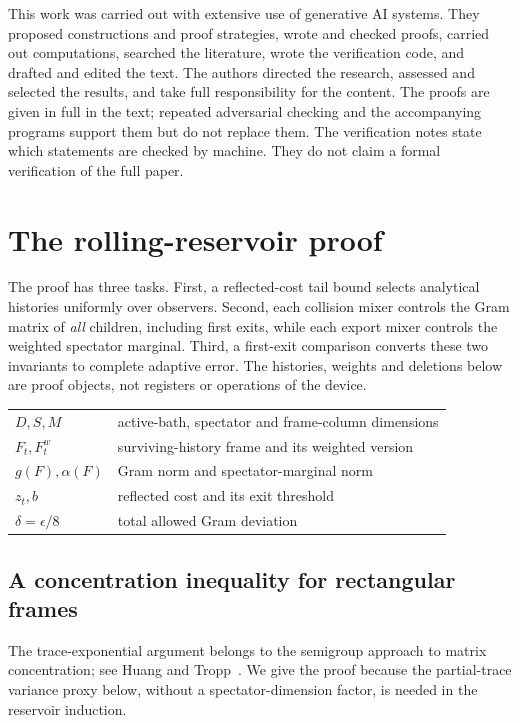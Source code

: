 \documentclass[11pt,a4paper]{article}
\theoremstyle{plain}
\theoremstyle{definition}
\theoremstyle{remark}
\begin{document}
This work was carried out with extensive use of generative AI systems. They proposed constructions and proof strategies, wrote and
checked proofs, carried out computations, searched the literature, wrote the verification code, and drafted and edited the text. The
authors directed the research, assessed and selected the results, and take full responsibility for the content. The proofs are given in
full in the text; repeated adversarial checking and the accompanying programs support them but do not replace them. The verification
notes state which statements are checked by machine. They do not claim a formal
verification of the full paper.


\clearpage
\appendix
{}


\section{The rolling-reservoir proof}\label{app:reservoir}

The proof has three tasks. First, a reflected-cost tail bound selects analytical histories uniformly over observers.
Second, each collision mixer controls the Gram matrix of \emph{all} children, including first exits, while each export mixer controls the weighted spectator marginal.
Third, a first-exit comparison converts these two invariants to complete adaptive error. The histories, weights and deletions below are proof objects, not registers or operations of the device.

\begin{center}
\begin{tabular}{ll}
$D,S,M$ & active-bath, spectator and frame-column dimensions\\
$F_t,F_t^w$ & surviving-history frame and its weighted version\\
$g(F),\alpha(F)$ & Gram norm and spectator-marginal norm\\
$z_t,b$ & reflected cost and its exit threshold\\
$\delta=\epsilon/8$ & total allowed Gram deviation
\end{tabular}
\end{center}

\subsection{A concentration inequality for rectangular frames}

The trace-exponential argument belongs to the semigroup approach to matrix
concentration; see Huang and Tropp~\cite{HuangTropp2021}. We give the proof
because the partial-trace variance proxy below, without a spectator-dimension
factor, is needed in the reservoir induction.
\end{document}
